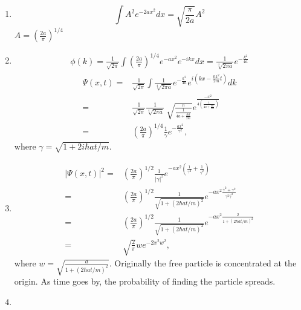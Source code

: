 \begin{enumerate}
    \item 
    $$
    \int A^2e^{-2ax^2}dx = \sqrt{\frac{\pi}{2a}}A^2
    $$
    $A = (\frac{2a}{\pi})^{1/4}$

    \item 
    \begin{align*}
        \phi(k) = \frac{1}{\sqrt{2\pi}}\int 
        (\frac{2a}{\pi})^{1/4}e^{-ax^2}e^{-ikx}dx
        = \frac{1}{\sqrt[4]{2\pi a}}e^{-\frac{k^2}{4a}}
    \end{align*}
    \begin{align*}
        \Psi(x,t) =& \frac{1}{\sqrt{2\pi}}
        \int \frac{1}{\sqrt[4]{2\pi a}}e^{-\frac{k^2}{4a}}
        e^{i(kx-\frac{\hbar k^2}{2m}t)}dk\\
        = & 
        \frac{1}{\sqrt{2\pi}}
        \frac{1}{\sqrt[4]{2\pi a}}\
        \sqrt{\frac{\pi}{\frac{1}{4a+\frac{i\hbar t}{2m}}}}
        e^{\frac{-x^2}{4(\frac{1}{4a+\frac{i\hbar t}{2m}})}}
        \\
        =& (\frac{2a}{\pi})^{1/4}\frac{1}{\gamma}e^{-\frac{ax^2}{\gamma^2}},
    \end{align*}
    where $\gamma = \sqrt{1+2i\hbar at/m}.$ 
    \item 
    \begin{align*}
        |\Psi(x,t)|^2 = &
        (\frac{2a}{\pi})^{1/2}\frac{1}{|\gamma|^2}
        e^{-ax^2(\frac{1}{\gamma^2}+\frac{1}{\bar{\gamma}^2})}\\
        = & (\frac{2a}{\pi})^{1/2}
        \frac{1}{\sqrt{1+(2\hbar at/m)^2}}e^{-ax^2\frac{\bar{\gamma}^2 + \gamma^2}
        {\gamma^2\bar{\gamma}^2}}\\
        = & 
        (\frac{2a}{\pi})^{1/2}
        \frac{1}{\sqrt{1+(2\hbar at/m)^2}}
        e^{-ax^2\frac{2}
        {1+(2\hbar at/m)^2}}\\
        =& \sqrt{\frac{2}{\pi}}we^{-2x^2w^2},
    \end{align*}
    where $w=\sqrt{\frac{a}{1+(2\hbar a t /m)^2}}.$
    Originally the free particle is concentrated at the origin. As time goes by, the probability of finding the particle spreads.

    \item 


\end{enumerate}
